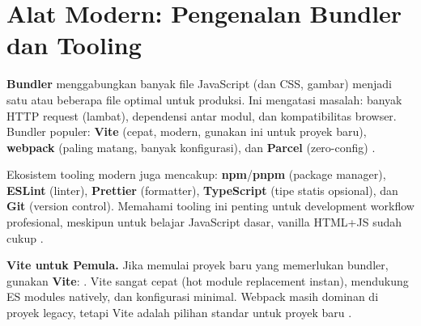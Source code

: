 \section{Alat Modern: Pengenalan Bundler dan Tooling}

\textbf{Bundler} menggabungkan banyak file JavaScript (dan CSS, gambar) menjadi satu atau beberapa file optimal untuk produksi. Ini mengatasi masalah: banyak HTTP request (lambat), dependensi antar modul, dan kompatibilitas browser. Bundler populer: \textbf{Vite} (cepat, modern, gunakan ini untuk proyek baru), \textbf{webpack} (paling matang, banyak konfigurasi), dan \textbf{Parcel} (zero-config) \cite{mdnToolsTesting}.

Ekosistem tooling modern juga mencakup: \textbf{npm}/\textbf{pnpm} (package manager), \textbf{ESLint} (linter), \textbf{Prettier} (formatter), \textbf{TypeScript} (tipe statis opsional), dan \textbf{Git} (version control). Memahami tooling ini penting untuk development workflow profesional, meskipun untuk belajar JavaScript dasar, vanilla HTML+JS sudah cukup \cite{mdnJsGuide}.

\begin{catatan}
\textbf{Vite untuk Pemula.} Jika memulai proyek baru yang memerlukan bundler, gunakan \textbf{Vite}: . Vite sangat cepat (hot module replacement instan), mendukung ES modules natively, dan konfigurasi minimal. Webpack masih dominan di proyek legacy, tetapi Vite adalah pilihan standar untuk proyek baru \cite{mdnToolsTesting}.
\end{catatan}

